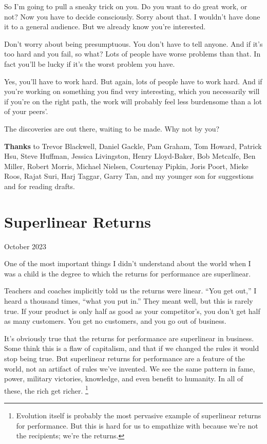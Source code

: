 \documentclass[12pt]{book}
\begin{document}
So I'm going to pull a sneaky trick on you. Do you want to do great
work, or not? Now you have to decide consciously. Sorry about that. I
wouldn't have done it to a general audience. But we already know you're
interested.

Don't worry about being presumptuous. You don't have to tell anyone. And
if it's too hard and you fail, so what? Lots of people have worse
problems than that. In fact you'll be lucky if it's the worst problem
you have.

Yes, you'll have to work hard. But again, lots of people have to work
hard. And if you're working on something you find very interesting,
which you necessarily will if you're on the right path, the work will
probably feel less burdensome than a lot of your peers'.

The discoveries are out there, waiting to be made. Why not by you?


\textbf{Thanks} to Trevor Blackwell, Daniel Gackle, Pam Graham, Tom
Howard, Patrick Hsu, Steve Huffman, Jessica Livingston, Henry
Lloyd-Baker, Bob Metcalfe, Ben Miller, Robert Morris, Michael Nielsen,
Courtenay Pipkin, Joris Poort, Mieke Roos, Rajat Suri, Harj Taggar,
Garry Tan, and my younger son for suggestions and for reading drafts.
\chapter{Superlinear Returns}

October 2023

One of the most important things I didn't understand about the world
when I was a child is the degree to which the returns for performance
are superlinear.

Teachers and coaches implicitly told us the returns were linear. ``You
get out,'' I heard a thousand times, ``what you put in.'' They meant
well, but this is rarely true. If your product is only half as good as
your competitor's, you don't get half as many customers. You get no
customers, and you go out of business.

It's obviously true that the returns for performance are superlinear in
business. Some think this is a flaw of capitalism, and that if we
changed the rules it would stop being true. But superlinear returns for
performance are a feature of the world, not an artifact of rules we've
invented. We see the same pattern in fame, power, military victories,
knowledge, and even benefit to humanity. In all of these, the rich get
richer. \footnote{Evolution itself is probably the most pervasive example of
superlinear returns for performance. But this is hard for us to
empathize with because we're not the recipients; we're the returns.}
\end{document}
